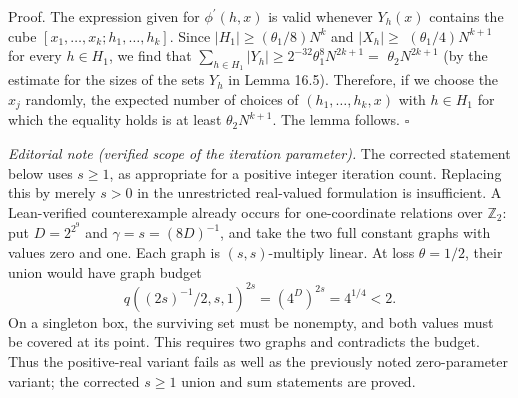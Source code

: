 \documentclass[10pt]{article}
\begin{document}
Proof. The expression given for $\phi^{\prime}(h, x)$ is valid whenever $Y_{h}(x)$ contains the cube $\left[x_{1}, \ldots, x_{k} ; h_{1}, \ldots, h_{k}\right]$. Since $\left|H_{1}\right| \geqslant\left(\theta_{1} / 8\right) N^{k}$ and $\left|X_{h}\right| \geqslant$ $\left(\theta_{1} / 4\right) N^{k+1}$ for every $h \in H_{1}$, we find that $\sum_{h \in H_{1}}\left|Y_{h}\right| \geqslant 2^{-32} \theta_{1}^{8} N^{2 k+1}=$ $\theta_{2} N^{2 k+1}$ (by the estimate for the sizes of the sets $Y_{h}$ in Lemma 16.5). Therefore, if we choose the $x_{j}$ randomly, the expected number of choices of $\left(h_{1}, \ldots, h_{k}, x\right)$ with $h \in H_{1}$ for which the equality holds is at least $\theta_{2} N^{k+1}$. The lemma follows. \(\square\)

\textit{Editorial note (verified scope of the iteration parameter).}
The corrected statement below uses $s\geqslant1$, as appropriate for a positive integer iteration count. Replacing this by merely $s>0$ in the unrestricted real-valued formulation is insufficient. A Lean-verified counterexample already occurs for one-coordinate relations over $\mathbb Z_2$: put $D=2^{2^9}$ and $\gamma=s=(8D)^{-1}$, and take the two full constant graphs with values zero and one. Each graph is $(s,s)$-multiply linear. At loss $\theta=1/2$, their union would have graph budget
\[
q((2s)^{-1}/2,s,1)^{2s}=(4^D)^{2s}=4^{1/4}<2.
\]
On a singleton box, the surviving set must be nonempty, and both values must be covered at its point. This requires two graphs and contradicts the budget. Thus the positive-real variant fails as well as the previously noted zero-parameter variant; the corrected $s\geqslant1$ union and sum statements are proved.
\end{document}
